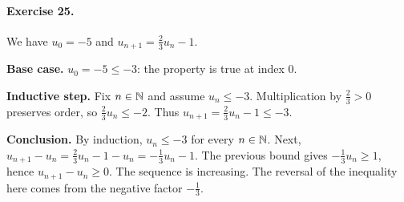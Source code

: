 \paragraph{Exercise 25.} We have $u_0=-5$ and $u_{n+1}=\frac23u_n-1$.
\par\smallskip\textbf{Base case.} $u_0=-5\le-3$: the property is true at index $0$.
\par\smallskip\textbf{Inductive step.} Fix $n\in\mathbb N$ and assume $u_n\le-3$. Multiplication by $\frac23>0$ preserves order, so $\frac23u_n\le-2$. Thus $u_{n+1}=\frac23u_n-1\le-3$.
\par\smallskip\textbf{Conclusion.} By induction, $u_n\le-3$ for every $n\in\mathbb N$.
Next, $u_{n+1}-u_n=\frac23u_n-1-u_n=-\frac13u_n-1$. The previous bound gives $-\frac13u_n\ge1$, hence $u_{n+1}-u_n\ge0$. The sequence is increasing. The reversal of the inequality here comes from the negative factor $-\frac13$.

\fi

